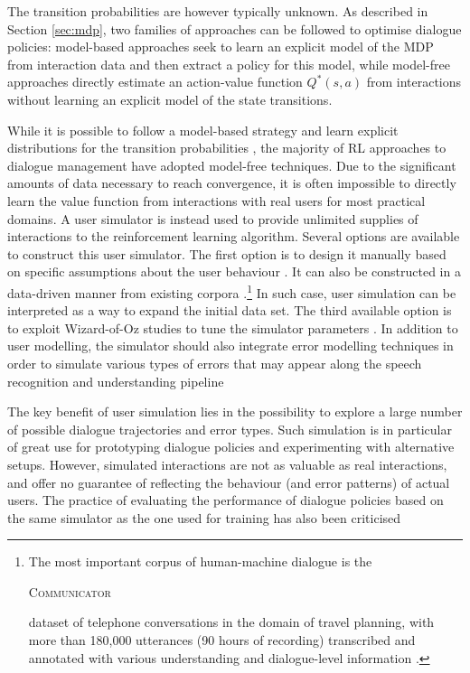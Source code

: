 The transition probabilities are however typically unknown.  As described in Section \ref{sec:mdp}, two families of approaches can be followed to optimise dialogue policies: model-based approaches seek to learn an explicit model of the MDP from interaction data and then extract a policy for this model, while model-free approaches directly estimate an action-value function $Q^*(s,a)$  from interactions without learning an explicit model of the state transitions.  

While it is possible to follow a model-based strategy and learn explicit distributions for the transition probabilities \citep{SinghLKW02,tetreault2006using}, the majority of RL approaches to dialogue management have adopted model-free techniques. Due to the significant amounts of data necessary to reach convergence, it is often impossible to directly learn the value function from interactions with real users for most practical domains.  A user simulator is instead used to provide unlimited supplies of interactions to the reinforcement learning algorithm.   Several options are available to construct this user simulator.  The first option is to design it manually based on specific assumptions about the user behaviour \citep{Pietquin:2006,Schatzmann:2007:AUS:1614108.1614146}.  It can also be constructed in a data-driven manner from existing corpora \citep{GeorgilaHL06}.\footnote{The most important corpus of human-machine dialogue is the \begin{small}\textsc{Communicator}\end{small} dataset of telephone conversations in the domain of travel planning, with more than 180,000 utterances (90 hours of recording) transcribed and annotated with various understanding and dialogue-level information \citep{BennettR02}.}  In such case, user simulation can be interpreted as a way to expand the initial data set.  The third available option is to exploit  Wizard-of-Oz studies to tune the simulator parameters \citep{Rieser:2010:LHM:1735495.1735497}.  In addition to user modelling, the simulator should also integrate error modelling techniques in order to simulate various types of errors that may appear along the speech recognition and understanding pipeline \citep{SchatzmannTY07,ThomsonGHTY12}

The key benefit of user simulation lies in the possibility to explore a large number of possible dialogue trajectories and error types.  Such simulation is in particular of great use for prototyping dialogue policies and experimenting with alternative setups. However, simulated interactions are not as valuable as real interactions, and offer no guarantee of reflecting the behaviour (and error patterns) of actual users.  The practice of evaluating the performance of dialogue policies based on the same simulator as the one used for training has also been criticised \citep{paek2006}

